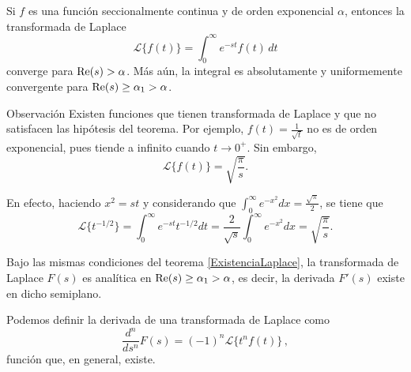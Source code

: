 \begin{teorema} \label{ExistenciaLaplace}
Si $f$ es una función seccionalmente continua y de orden exponencial $\alpha$, entonces la transformada de Laplace
\begin{equation*}
    \mathcal{L}\{f(t)\} = \int_0^{\infty} e^{-st} f(t) \, dt
\end{equation*}
converge para $\operatorname{Re}(s) > \alpha$. Más aún, la integral es absolutamente y uniformemente convergente para $\operatorname{Re}(s) \geq \alpha_1 >  \alpha$.
\end{teorema}

\begin{obs}{Observación}
    Existen funciones que tienen transformada de Laplace y que no satisfacen las hipótesis del teorema. Por ejemplo, $f(t) = \frac{1}{\sqrt{t}}$ no es de orden exponencial, pues tiende a infinito cuando $t \to 0^+$. Sin embargo,
    \begin{equation*}
        \mathcal{L}\{f(t)\} = \sqrt{\frac{\pi}{s}}.
    \end{equation*}

    En efecto, haciendo $x^2 = st$ y considerando que $\int_0^{\infty} e^{-x^2} dx = \frac{\sqrt{\pi}}{2}$, se tiene que
    \begin{equation*}
        \mathcal{L}\{t^{-1/2}\} = \int_0^{\infty} e^{-st}t^{-1/2}dt = \frac{2}{\sqrt{s}} \int_0^{\infty} e^{-x^2} dx = \sqrt{\frac{\pi}{s}}.
    \end{equation*}
\end{obs}



\begin{teorema}
    Bajo las mismas condiciones del teorema \ref{ExistenciaLaplace}, la transformada de Laplace $F(s)$ es analítica en $\operatorname{Re}(s) \geq \alpha_1 > \alpha$, es decir, la derivada $F'(s)$ existe en dicho semiplano.
\end{teorema}

\begin{propo}
    Podemos definir la derivada de una transformada de Laplace como 
    \begin{equation}
        \frac{d^n}{ds^n} F(s) = (-1)^n \mathcal{L}\{t^n f(t)\} \, ,
    \end{equation}
    función que, en general, existe.
\end{propo}

